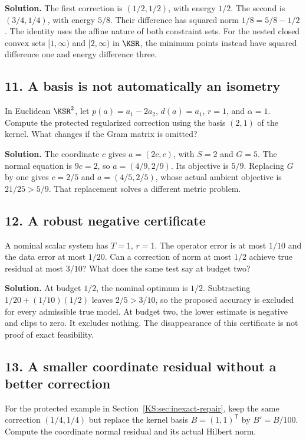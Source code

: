\documentclass[11pt,oneside,openany]{book}
\numberwithin{equation}{section}
\begin{document}
\textbf{Solution.} The first correction is $(1/2,1/2)$, with energy $1/2$. The second is $(3/4,1/4)$, with energy $5/8$. Their difference has squared norm $1/8=5/8-1/2$. The identity uses the affine nature of both constraint sets. For the nested closed convex sets $[1,\infty)$ and $[2,\infty)$ in $\KSR$, the minimum points instead have squared difference one and energy difference three.

\subsection*{11. A basis is not automatically an isometry}
In Euclidean $\KSR^2$, let $p(a)=a_1-2a_2$, $d(a)=a_1$, $r=1$, and $\alpha=1$. Compute the protected regularized correction using the basis $(2,1)$ of the kernel. What changes if the Gram matrix is omitted?

\textbf{Solution.} The coordinate $c$ gives $a=(2c,c)$, with $S=2$ and $G=5$. The normal equation is $9c=2$, so $a=(4/9,2/9)$. Its objective is $5/9$. Replacing $G$ by one gives $c=2/5$ and $a=(4/5,2/5)$, whose actual ambient objective is $21/25>5/9$. That replacement solves a different metric problem.

\subsection*{12. A robust negative certificate}
A nominal scalar system has $T=1$, $r=1$. The operator error is at most $1/10$ and the data error at most $1/20$. Can a correction of norm at most $1/2$ achieve true residual at most $3/10$? What does the same test say at budget two?

\textbf{Solution.} At budget $1/2$, the nominal optimum is $1/2$. Subtracting $1/20+(1/10)(1/2)$ leaves $2/5>3/10$, so the proposed accuracy is excluded for every admissible true model. At budget two, the lower estimate is negative and clips to zero. It excludes nothing. The disappearance of this certificate is not proof of exact feasibility.

\subsection*{13. A smaller coordinate residual without a better correction}
For the protected example in Section~\ref{KS:sec:inexact-repair}, keep the same correction $(1/4,1/4)$ but replace the kernel basis $B=(1,1)^{\mathsf T}$ by $B'=B/100$. Compute the coordinate normal residual and its actual Hilbert norm.
\end{document}
